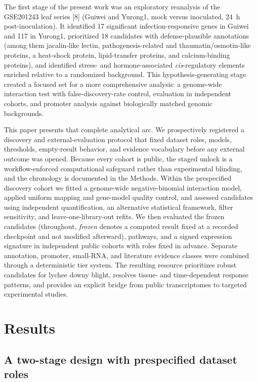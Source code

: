 \documentclass[11pt]{article}
\begin{document}
The first stage of the present work was an exploratory reanalysis of the GSE201243 leaf series [8] (Guiwei and Yurong1, mock versus inoculated, 24~h post-inoculation). It identified 17 significant infection-responsive genes in Guiwei and 117 in Yurong1, prioritized 18 candidates with defense-plausible annotations (among them jacalin-like lectin, pathogenesis-related and thaumatin/osmotin-like proteins, a heat-shock protein, lipid-transfer proteins, and calcium-binding proteins), and identified stress- and hormone-associated \textit{cis}-regulatory elements enriched relative to a randomized background. This hypothesis-generating stage created a focused set for a more comprehensive analysis: a genome-wide interaction test with false-discovery-rate control, evaluation in independent cohorts, and promoter analysis against biologically matched genomic backgrounds.

This paper presents that complete analytical arc. We prospectively registered a discovery and external-evaluation protocol that fixed dataset roles, models, thresholds, empty-result behavior, and evidence vocabulary before any external outcome was opened. Because every cohort is public, the staged unlock is a workflow-enforced computational safeguard rather than experimental blinding, and the chronology is documented in the Methods. Within the prespecified discovery cohort we fitted a genome-wide negative-binomial interaction model, applied uniform mapping and gene-model quality control, and assessed candidates using independent quantification, an alternative statistical framework, filter sensitivity, and leave-one-library-out refits. We then evaluated the frozen candidates (throughout, \emph{frozen} denotes a computed result fixed at a recorded checkpoint and not modified afterward), pathways, and a signed expression signature in independent public cohorts with roles fixed in advance. Separate annotation, promoter, small-RNA, and literature evidence classes were combined through a deterministic tier system. The resulting resource prioritizes robust candidates for lychee downy blight, resolves tissue- and time-dependent response patterns, and provides an explicit bridge from public transcriptomes to targeted experimental studies.

\section{Results}

\subsection{A two-stage design with prespecified dataset roles}
\end{document}
